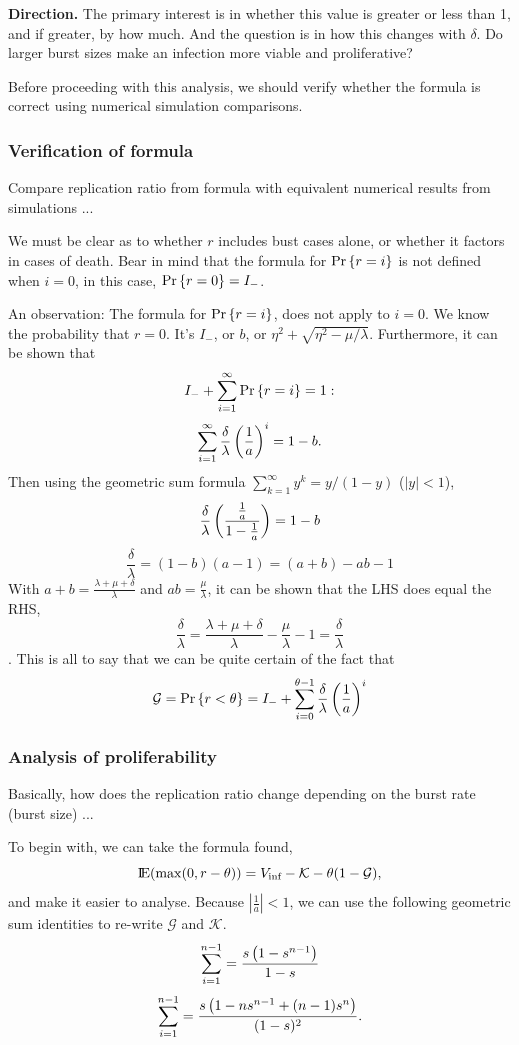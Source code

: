 \vspace{10pt}
\noindent
\textbf{Direction.} The primary interest is in whether this value is greater or less than 1, and if greater, by how much. And the question is in how this changes with $\delta$. Do larger burst sizes make an infection more viable and proliferative?\par
Before proceeding with this analysis, we should verify whether the formula is correct using numerical simulation comparisons.    

\subsubsection{Verification of formula}
Compare replication ratio from formula with equivalent numerical results from simulations ...

We must be clear as to whether $r$ includes bust cases alone, or whether it factors in cases of death. Bear in mind that the formula for ${\text{Pr}\left\{r = i\right\}}$ is not defined when $i=0$, in this case, ${\text{Pr}\left\{r = 0\right\}} = I_-$.\par
An observation: The formula for ${\text{Pr}\left\{r=i\right\}}$, does not apply to $i=0$. We know the probability that $r=0$. It's $I_-$, or $b$, or $\eta^2 + \sqrt{\eta^2-\mu/\lambda}$. Furthermore, it can be shown that 
$$I_- + \sum_{i=1}^{\infty} {\text{Pr}\left\{r=i \right\}} = 1:$$
$$ \sum_{i=1}^{\infty}\frac{\delta}{\lambda}\left(\frac{1}{a}\right)^i = 1 - b. $$
Then using the geometric sum formula $\sum_{k=1}^{\infty} y^k = y/(1-y) $ ($|{y}|<1$),
$$\frac{\delta}{\lambda} \left(\frac{\frac{1}{a}}{1 - \frac{1}{a}}\right) = 1 - b$$
$$\frac{\delta}{\lambda} = (1-b)(a-1) = (a+b) - ab - 1$$
With $a+b = \frac{\lambda + \mu + \delta}{\lambda}$ and $ab = \frac{\mu}{\lambda}$, it can be shown that the LHS does equal the RHS,
$$\frac{\delta}{\lambda}  =  \frac{\lambda + \mu + \delta}{\lambda}  -  \frac{\mu}{\lambda} - 1 = \frac{\delta}{\lambda} $$. 
This is all to say that we can be quite certain of the fact that 
$$\mathcal{G} = {\text{Pr}\left\{r < \theta\right\}} = I_- + \sum^{\theta - 1}_{i = 0} \frac{\delta}{\lambda}\left(\frac{1}{a}\right)^i$$


\subsubsection{Analysis of proliferability} 
Basically, how does the replication ratio change depending on the burst rate (burst size) ...

To begin with, we can take the formula found,
$${\rm I}\!{\rm E}(\max(0,r-\theta))  = V_{\text{inf} }-  \mathcal{K} - \theta ( 1 -  \mathcal{G}),$$
and make it easier to analyse. Because $|\frac{1}{a}| < 1$, we can use the following geometric sum identities to re-write $\mathcal{G}$ and $\mathcal{K}$.
$$\sum_{i=1}^{n-1} = \frac{s\left(1-s^{n-1} \right)}{1-s} $$
$$\sum_{i=1}^{n-1} = \frac{s\left(1 - n s^{n-1}  +(n-1) s^{n}  \right) }{ (1-s)^2}. $$

